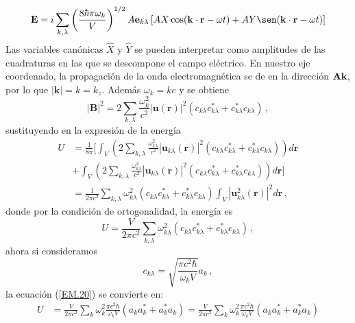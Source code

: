 \begin{equation*}
  \mathbf{E} = i \sum_{k,\lambda} \left( \frac{8\hbar \pi \omega_k}{V} \right)^{1/2} \hat{\mathbf{e}}_{k\lambda} \left[ \hat{X}\cos(\mathbf{k}\cdot\mathbf{r} - \omega t) + \hat{Y}\sen(\mathbf{k}\cdot\mathbf{r} - \omega t) \right]
\end{equation*}
Las variables canónicas $\hat{X}$ y $\hat{Y}$ se pueden interpretar como amplitudes de las cuadraturas en las que se descompone el campo eléctrico. \cite{Mandel}
En nuestro eje coordenado, la propagación de la onda electromagnética se de en la dirección $\mathbf{\hat{\textnormal{\bfseries k}}}$, por lo que $|\mathbf{k}| = k = k_z$. Además $\omega_k = kc$ y se obtiene
\begin{equation}
  \label{EM.19}
  |\mathbf{B}|^2 = 2 \sum_{k,\lambda} \frac{\omega_k^2}{c^2}  |\mathbf{u}(\mathbf{r})|^2 \left( c_{k\lambda} c_{k\lambda}^* + c_{k\lambda}^* c_{k\lambda} \right) \,,
\end{equation}
sustituyendo en la expresión de la energía
\begin{align*}
  U & = \frac{1}{8\pi} \Bigg[ \int_V \left( 2\sum_{k,\lambda} \frac{\omega_{k\lambda}^2}{c^2}  |\mathbf{u}_{k\lambda}(\mathbf{r})|^2 \left( c_{k\lambda} c_{k\lambda}^* + c_{k\lambda}^* c_{k\lambda} \right) \right) d\mathbf{r} \\ &+ \int_V \left( 2 \sum_{k,\lambda} \frac{\omega_{k\lambda}^2}{c^2} |\mathbf{u}_{k\lambda}(\mathbf{r})|^2 \left( c_{k\lambda} c_{k\lambda}^* + c_{k\lambda}^* c_{k\lambda} \right) \right)d\mathbf{r} \Bigg] \\
    & = \frac{1}{2\pi c^2} \sum_{k,\lambda} \omega_{k\lambda}^2 \left( c_{k\lambda} c_{k\lambda}^* + c_{k\lambda}^* c_{k\lambda} \right) \int_V |\mathbf{u}_{k\lambda}^2(\mathbf{r})|^2 d\mathbf{r} \,,
\end{align*}
donde por la condición de ortogonalidad, la energía es
\begin{equation}
  \label{EM.20}
  U = \frac{V}{2\pi c^2}\sum_{k,\lambda} \omega_{k\lambda}^2 \left( c_{k\lambda} c_{k\lambda}^* + c_{k\lambda}^* c_{k\lambda} \right) \,,
\end{equation}
ahora si consideramos
\begin{equation}
  \label{EM.21}
  c_{k\lambda} = \sqrt{\frac{\pi c^{2}\hbar}{\omega_{k}V}} a_{k}\,,
\end{equation}
la ecuaci\'on (\ref{EM.20}) se convierte en:
\begin{align*}
  U & = \frac{V}{2\pi c^2}\sum_{k} \omega_{k}^2 \frac{\pi c^{2}\hbar}{\omega_{k}V}\left(a_{k}a^{*}_{k} + a_{k}^{*} a_{k} \right) = \frac{V}{2\pi c^2}\sum_{k} \omega_{k}^2 \frac{\pi c^{2}\hbar}{\omega_{k}V}\left(a_{k}a^{*}_{k} + a_{k}^{*} a_{k} \right) \\
\end{align*}
